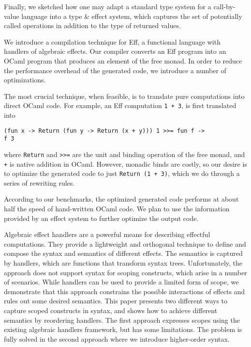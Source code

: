 \documentclass[a4paper,UKenglish]{dagrep}
\begin{document}
Finally, we sketched how one may adapt a standard type system for a call-by-value language into a type \& effect system, which captures the set of potentially called operations in addition to the type of returned values.

\license

We introduce a compilation technique for Eff, a functional language with handlers of algebraic effects. Our compiler converts an Eff program into an OCaml program that produces an element of the free monad. In order to reduce the performance overhead of the generated code, we introduce a number of optimizations.

The most crucial technique, when feasible, is to translate pure computations into direct OCaml code. For example, an Eff computation \verb|1 + 3|, is first translated into
\begin{verbatim}
(fun x -> Return (fun y -> Return (x + y))) 1 >>= fun f ->
f 3
\end{verbatim}
where \verb|Return| and \verb|>>=| are the unit and binding operation of the free monad, and \verb|+| is native addition in OCaml.
However, monadic binds are costly, so our desire is to optimize the generated code to just \verb|Return (1 + 3)|, which we do through a series of rewriting rules.

According to our benchmarks, the optimized generated code performs at about half the speed of hand-written OCaml code. We plan to use the information provided by an effect system to further optimize the output code.

\license
{}

Algebraic effect handlers are a powerful means for describing
effectful computations. They provide a lightweight and orthogonal
technique to define and compose the syntax and semantics of
different effects. The semantics is captured by handlers, which are
functions that transform syntax trees.
Unfortunately, the approach does not support syntax for scoping
constructs, which arise in a number of scenarios. While handlers can
be used to provide a limited form of scope, we demonstrate that this
approach constrains the possible interactions of effects and rules out
some desired semantics.
This paper presents two different ways to capture scoped constructs
in syntax, and shows how to achieve different semantics by
reordering handlers. The first approach expresses scopes using the
existing algebraic handlers framework, but has some limitations. The
problem is fully solved in the second approach where we introduce
higher-order syntax.
\end{document}
